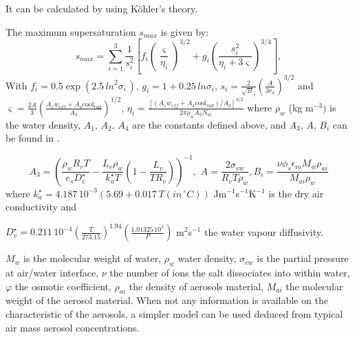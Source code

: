 It can be calculated by using K\"{o}hler's theory.

The maximum supersaturation $s_{max} $ is given by:
\begin{equation}
s_{max}=\sum\limits_{i=1}^3 \frac{1}{s_{i}^{2}} \left[ f_{i}\left(
\frac{\varsigma }{\eta_{i}} \right)^{3/2}+g_{i}\left( \frac{s_{i}^{2}}{\eta
_{i}+3\varsigma } \right)^{3/4} \right],
\end{equation}
With $f_{i}=0.5\exp \left( 2.5\, {ln}^{2}\sigma_{i\, } \right),\, g_{i}=1+0.25\, ln\sigma_{i}$,
$s_{i}=\frac{2}{\sqrt B_{i} }\left(\frac{A}{3r_{a}} \right)^{3/2}$
\newline
and
$\varsigma = \frac{2A}{3}\left(
\frac{A_{1}w_{eff}+A_{4}\text{cool}_{rad}}{A_{3}} \right)^{1/2}$,
$\eta_{i}=\frac{\left[ \left(
A_{1}w_{eff}+A_{4}\text{cool}_{rad} \right)/A_{3} \right]^{3/2}}{2\pi
\rho_{w}A_{2}N_{ai}}$
\newline
where $\rho_{w}$ (kg m$^{-3})$ is the water density, $A_{1}$, $A_{2}$,
$A_{4}$ are the constants defined above,
and $A_{3}$, $A$, $B_{i}$ can be found in
 \cite{Abdul-Razzak:2000}.

\begin{equation}
A_{3}=\left( \frac{\rho_{w}R_{v}T}{e_{s}D_{v}^{\star }}-\frac{L_{v}\rho
_{w}}{k_{a}^{\star }T}\left( 1-\frac{L_{v}}{TR_{v}} \right) \right)^{-1},\,
\, A=\frac{2\sigma_{vw}}{R_{v}T\rho_{w}},
B_{i}=\frac{\nu \phi_{s}\epsilon_{m}M_{w}\rho_{ai}}{M_{ai}\rho_{w}}
\end{equation}
where $k_{a}^{\star }=4.187\, {10}^{-3}\left( 5.69+0.017\, T\left( in\,
^{\circ}C \right) \right)$ Jm$^{-1}$s$^{-1}$K$^{-1}$ is the dry air
conductivity and

$D_{v}^{\star }=0.211\, {10}^{-4}\left( \frac{T}{273.15} \right)^{1.94}\left(
\frac{1.01325\, {10}^{5}}{P} \right)$ m$^{2}$s$^{-1}$ the water vapour
diffusivity.

$M_{w}$ is the molecular weight of water, $\rho_{w}$ water density,
$\sigma_{vw}$ is the partial pressure at air/water interface,
\newline
$\nu $ the number of ions the salt dissociates into within water,
\newline
$\varphi $ the osmotic coefficient, $\rho_{ai}$ the density of aerosols material,
\newline
$M_{ai}$ the molecular weight of the aerosol material.
\newline
When not any information is available on the characteristic of the aerosols,
a simpler model can be used deduced from typical air mass aerosol
concentrations.

